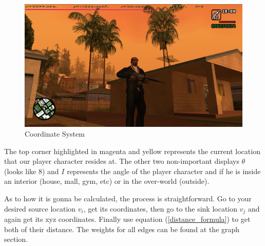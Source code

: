 \documentclass{article}
\begin{document}
	\begin{figure}[!h]
		\centering
		\includegraphics[width=1\textwidth]{./0img/coordinateSystem.png}
		\caption{Coordinate System}
	\end{figure} The top corner highlighted in magenta and yellow represents the current location that our player character resides at. The other two non-important displays \(\theta\) (looks like 8) and \(I\) represents the angle of the player character and if he is inside an interior (house, mall, gym, etc) or in the over-world (outside). 
	
	As to how it is gonna be calculated, the process is straightforward. Go to your desired source location \(v_{i}\), get its coordinates, then go to the sink location \(v_{j}\) and again get its xyz coordinates. Finally use equation (\ref{distance_formula}) to get both of their distance. The weights for all edges can be found at the graph section.
	
	\ifx\graphTheoryPreambleLoaded
\end{document}
